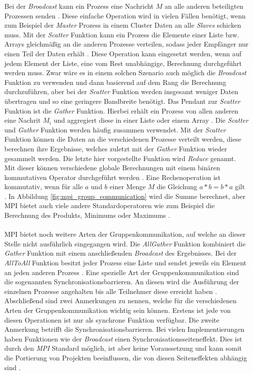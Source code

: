 Bei der \emph{Broadcast} kann ein Prozess eine Nachricht $M$ an alle anderen beteiligten Prozessen senden \cite{dongarra1995introduction}. Diese einfache Operation wird in vielen Fällen benötigt, wenn zum Beispiel der \emph{Master} Prozess in einem Cluster Daten an alle \emph{Slaves} schicken muss. Mit der \emph{Scatter} Funktion kann ein Prozess die Elemente einer Liste bzw. Arrays gleichmäßig an die anderen Prozesse verteilen, sodass jeder Empfänger nur einen Teil der Daten erhält \cite{nielsen2016introduction}. Diese Operation kann eingesetzt werden, wenn auf jedem Element der Liste, eine vom Rest unabhängige, Berechnung durchgeführt werden muss. Zwar wäre es in einem solchen Szenario auch möglich die \emph{Broadcast} Funktion zu verwenden und dann basierend auf dem Rang die Berechnung durchzuführen, aber bei der \emph{Scatter} Funktion werden insgesamt weniger Daten übertragen und so eine geringere Bandbreite benötigt. Das Pendant zur \emph{Scatter} Funktion ist die \emph{Gather} Funktion. Hierbei erhält ein Prozess von allen anderen eine Nachrit $M_i$ und aggregiert diese in einer Liste oder einem Array \cite{nielsen2016introduction}. Die \emph{Scatter} und \emph{Gather} Funktion werden häufig zusammen verwendet. Mit der \emph{Scatter} Funktion können die Daten an die verschiedenen Prozesse verteilt werden, diese berechnen ihre Ergebnisse, welches zuletzt mit der \emph{Gather} Funktion wieder gesammelt werden. Die letzte hier vorgestellte Funktion wird \emph{Reduce} genannt. Mit dieser können verschiedene globale Berechnungen mit einem binären kommutativen Operator durchgeführt werden \cite{nielsen2016introduction}. Eine Rechenoperation ist kommutativ, wenn für alle $a$ und $b$ einer Menge $M$  die Gleichung $a*b=b*a$ gilt \cite{walz2011brueckenkurs}. In Abbildung \ref{fig:mpi_group_communication} wird die Summe berechnet, aber \ac{MPI} bietet auch viele andere Standardoperatoren wie zum Beispiel die Berechnung des Produkts, Minimums oder Maximums \cite{nielsen2016introduction}. 
\\\\
\ac{MPI} bietet noch weitere Arten der Gruppenkommunikation, auf welche an dieser Stelle nicht ausführlich eingegangen wird. Die \emph{AllGather} Funktion kombiniert die \emph{Gather} Funktion mit einem anschließenden \emph{Broadcast} des Ergebnisses. Bei der \emph{AllToAll} Funktion besitzt jeder Prozess eine Liste und sendet jeweils ein Element an jeden anderen Prozess \cite{dongarra1995introduction}. Eine spezielle Art der Gruppenkommunikation sind die sogenannten Synchronisationsbarrieren. An diesen wird die Ausführung der einzelnen Prozesse angehalten bis alle Teilnehmer diese erreicht haben \cite{nielsen2016introduction}. Abschließend sind zwei Anmerkungen zu nennen, welche für die verschiedenen Arten der Gruppenkommunikation wichtig sein können. Erstens ist jede von diesen Operationen ist nur als synchrone Funktion verfügbar. Die zweite Anmerkung betrifft die Synchronisationsbarrieren. Bei vielen Implementierungen haben Funktionen wie der \emph{Broadcast} einen Synchronisationsseiteneffekt. Dies ist durch den \emph{MPI} Standard möglich, ist aber keine Voraussetzung und kann somit die Portierung von Projekten beeinflussen, die von diesen Seiteneffekten abhängig sind \cite{dongarra1995introduction}.

